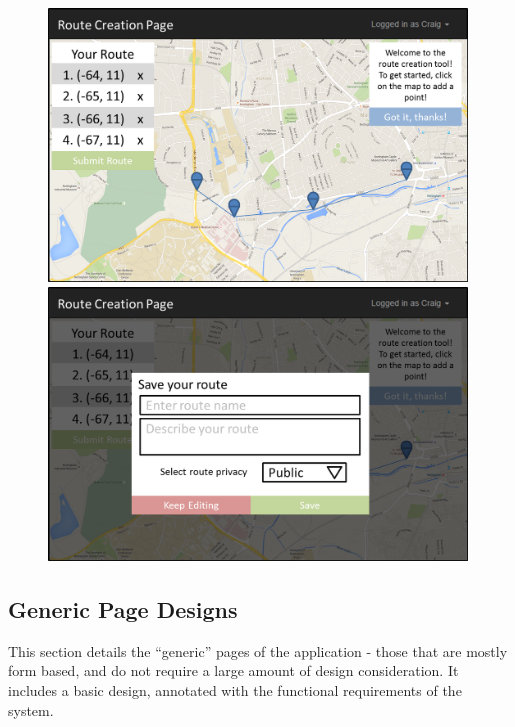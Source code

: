 \begin{figure}[!ht]
\centering
	\begin{minipage}{.49\textwidth}
		\includegraphics[width=0.99\textwidth]{images/ui-rcp-1.png}
	\end{minipage}
	\begin{minipage}{.49\textwidth}
	\includegraphics[width=0.99\textwidth]{images/ui-rcp-2.png}

	\end{minipage}
\end{figure}


\newpage 
\subsection{Generic Page Designs}
\label{subsec:gpd}
This section details the ``generic'' pages of the application - those that are mostly form based, and do not require a large amount of design consideration. It includes a basic design, annotated with the functional requirements of the system. 


